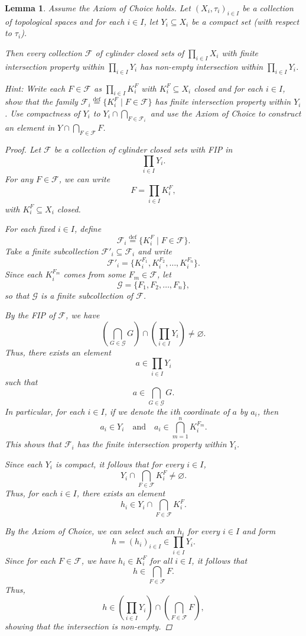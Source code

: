 \documentclass[12pt]{article}
\theoremstyle{bigskipthmstyle}
\theoremstyle{thmstyle}
\newtheorem{lemma}[theorem]{Lemma}
\theoremstyle{plainstyle}
\newcommand{\df}{\stackrel{\text{def}}{=}}
\newcommand{\cF}{\mathcal{F}}
\newcommand{\cG}{\mathcal{G}}
\begin{document}
\begin{lemma}\label{lem:cylFIP}
  Assume the Axiom of Choice holds. Let $(X_i,\tau_i)_{i\in I}$ be a collection of topological
  spaces and for each $i\in I$, let $Y_i\subseteq X_i$ be a compact set (with respect to $\tau_i$).

  Then every collection $\cF$ of cylinder closed sets of $\prod_{i\in I} X_i$ with finite intersection property within
  $\prod_{i\in I} Y_i$ has non-empty intersection within $\prod_{i\in I} Y_i$.

  Hint: Write each $F\in\cF$ as $\prod_{i\in I} K^F_i$ with $K^F_i\subseteq X_i$ closed and for each $i\in I$, show that the
  family $\cF_i\df\{K^F_i \mid F\in\cF\}$ has finite intersection property within $Y_i$. Use compactness of $Y_i$ to
  $Y_i\cap\bigcap_{F\in\cF_i}$ and use the Axiom of Choice to construct an element in $Y\cap\bigcap_{F\in\cF} F$.

  
\begin{proof}
Let $\cF$ be a collection of cylinder closed sets with FIP in 
\[
\prod_{i\in I} Y_i.
\]
For any $F\in \cF$, we can write
\[
F = \prod_{i\in I} K^F_i,
\]
with $K^F_i \subseteq X_i$ closed.

For each fixed $i\in I$, define
\[
\cF_i \df \{K^F_i \mid F\in \cF\}.
\]
Take a finite subcollection $\cF'_i\subseteq \cF_i$ and write
\[
\cF'_i = \{K^{F_1}_i, K^{F_2}_i, \dots, K^{F_n}_i\}.
\]
Since each $K^{F_m}_i$ comes from some $F_m\in \cF$, let
\[
\cG = \{F_1, F_2, \dots, F_n\},
\]
so that $\cG$ is a finite subcollection of $\cF$.

By the FIP of $\cF$, we have
\[
\left( \bigcap_{G \in \cG} G \right) \cap \left( \prod_{i\in I} Y_i \right) \neq \varnothing.
\]
Thus, there exists an element 
\[
a \in \prod_{i\in I} Y_i
\]
such that
\[
a \in \bigcap_{G \in \cG} G.
\]
In particular, for each $i\in I$, if we denote the $i$th coordinate of $a$ by $a_i$, then
\[
a_i \in Y_i \quad \text{and} \quad a_i \in \bigcap_{m=1}^n K^{F_m}_i.
\]
This shows that $\cF_i$ has the finite intersection property within $Y_i$.

Since each $Y_i$ is compact, it follows that for every $i\in I$,
\[
Y_i \cap \bigcap_{F\in \cF} K^F_i \neq \varnothing.
\]
Thus, for each $i\in I$, there exists an element 
\[
h_i \in Y_i \cap \bigcap_{F\in \cF} K^F_i.
\]

By the Axiom of Choice, we can select such an $h_i$ for every $i\in I$ and form
\[
h = (h_i)_{i\in I} \in \prod_{i\in I} Y_i.
\]
Since for each $F\in \cF$, we have $h_i \in K^F_i$ for all $i\in I$, it follows that
\[
h \in \bigcap_{F\in \cF} F.
\]
Thus,
\[
h \in \left( \prod_{i\in I} Y_i \right) \cap \left( \bigcap_{F\in \cF} F \right),
\]
showing that the intersection is non-empty.

\renewcommand\qedsymbol{QED}
\end{proof}


\end{lemma}
\end{document}
